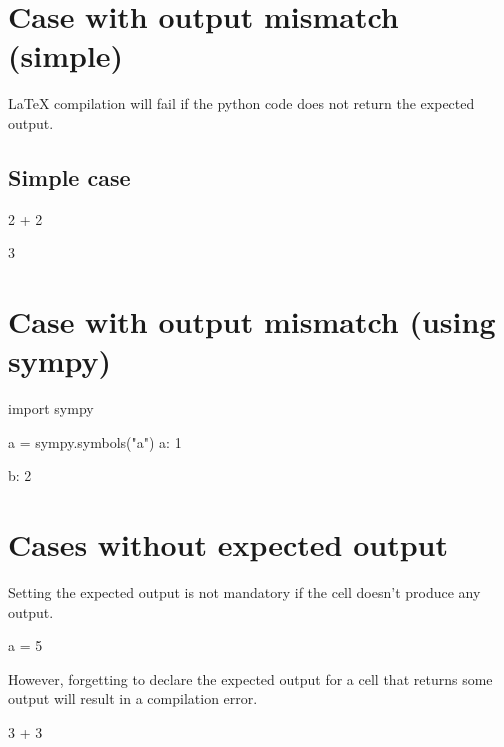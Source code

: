 \documentclass[oneside]{book}
\begin{document}
\chapter{Case with output mismatch (simple)}

LaTeX compilation will fail if the python code does not return the expected output.

\section{Simple case}

\begin{pycell}
2 + 2
\end{pycell}
\begin{pyexpectedoutput}
3
\end{pyexpectedoutput}

\chapter{Case with output mismatch (using sympy)}

\begin{pycell}
import sympy

a = sympy.symbols("a")
{a: 1}
\end{pycell}
\begin{pyexpectedoutput}
{b: 2}
\end{pyexpectedoutput}

\chapter{Cases without expected output}

Setting the expected output is not mandatory if the cell doesn't produce any output.

\begin{pycell}
a = 5
\end{pycell}

However, forgetting to declare the expected output for a cell that returns some output will result in a compilation error.
\begin{pycell}
3 + 3
\end{pycell}

\ifPythonTeXLoaded
\else
\fi
\end{document}

